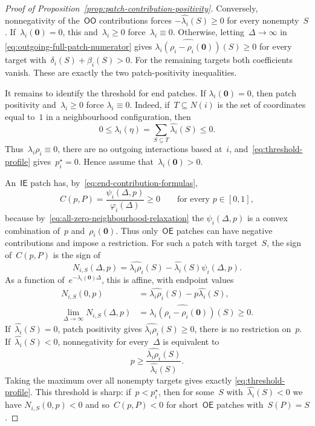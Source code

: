 \documentclass[EJP,preprint,NODS,nobera]{ejpecp}
\newcommand{\bb}[1]{\left(#1\right)}
\newcommand{\mb}[1]{\mathbf{#1}}
\begin{document}
\begin{proof}[Proof of Proposition~\ref{prop:patch-contribution-positivity}]
{\color{red}
Conversely, nonnegativity of the~$\mathsf{OO}$ contributions forces
$-\widehat{\lambda_i}(S)\geq0$ for every nonempty~$S$.
If~$\lambda_i(\mb0)=0$, this and~$\lambda_i\geq0$ force~$\lambda_i\equiv0$.
Otherwise, letting~$\Delta\to\infty$ in
\eqref{eq:outgoing-full-patch-numerator} gives
$\widehat{\lambda_i(\rho_i-\rho_i(\mb0))}(S)\geq0$ for every target
with~$\delta_i(S)+\beta_i(S)>0$.
For the remaining targets both coefficients vanish.
These are exactly the two patch-positivity inequalities.
}


It remains to identify the threshold for end patches. If
$\lambda_i(\mb 0)=0$, then patch positivity and~$\lambda_i\geq0$ force
$\lambda_i\equiv0$. Indeed, if~$T\subseteq N(i)$ is the set of coordinates
equal to~$1$ in a neighbourhood configuration, then
\begin{equation*}
0
\leq
\lambda_i(\eta)
=
\sum_{S\subseteq T}\widehat{\lambda_i}(S)
\leq0.
\end{equation*}
Thus~$\lambda_i\rho_i\equiv0$, there are no outgoing interactions based
at~$i$, and~\eqref{eq:threshold-profile} gives~$p_i^\star=0$. Hence assume
that~$\lambda_i(\mb 0)>0$.

An~$\mathsf{IE}$ patch has, by~\eqref{eq:end-contribution-formulas},
\begin{equation*}
C(p,P)
=
\frac{\psi_i(\Delta,p)}{\varphi_i(\Delta)}
\geq0
\qquad
\text{for every }p\in[0,1],
\end{equation*}
because by~\eqref{eq:all-zero-neighbourhood-relaxation} the
$\psi_i(\Delta,p)$ is a convex combination of~$p$ and~$\rho_i(\mb 0)$.
Thus only~$\mathsf{OE}$ patches can have negative contributions and impose a restriction. For such a patch
with target~$S$, the sign of~$C(p,P)$ is the sign of
\begin{equation*}
N_{i,S}(\Delta,p)
=
\widehat{\lambda_i\rho_i}(S)
-
\widehat{\lambda_i}(S)\psi_i(\Delta,p).
\end{equation*}
As a function of~$e^{-\lambda_i(\mb 0)\Delta}$, this is affine, with endpoint
values
\begin{align*}
N_{i,S}(0,p)
&=
\widehat{\lambda_i\rho_i}(S)
-
p\widehat{\lambda_i}(S),
\\
\lim_{\Delta\to\infty}N_{i,S}(\Delta,p)
&=
\widehat{\lambda_i\bb{\rho_i-\rho_i(\mb 0)}}(S)
\geq0.
\end{align*}
If~$\widehat{\lambda_i}(S)=0$, patch positivity gives
$\widehat{\lambda_i\rho_i}(S)\geq0$, there is no restriction on~$p$.
If~$\widehat{\lambda_i}(S)<0$, nonnegativity for every~$\Delta$ is
equivalent to
\begin{equation*}
p
\geq
\frac{\widehat{\lambda_i\rho_i}(S)}
{\widehat{\lambda_i}(S)}.
\end{equation*}
Taking the maximum over all nonempty targets gives exactly
\eqref{eq:threshold-profile}. This threshold is sharp: if~$p<p_i^\star$,
then for some~$S$ with~$\widehat{\lambda_i}(S)<0$ we have
$N_{i,S}(0,p)<0$ and so~$C(p,P)<0$ for short~$\mathsf{OE}$ patches with~$S(P)=S$.


\end{proof}
\end{document}
